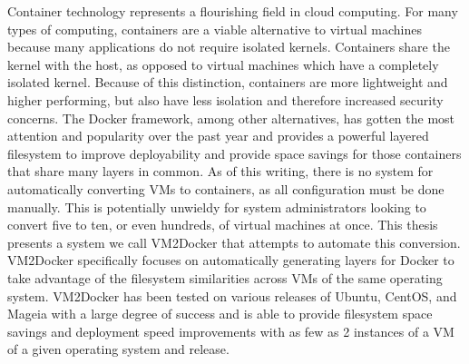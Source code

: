 % 
% 
%
Container technology represents a flourishing field in cloud computing. For many types of computing, containers are a viable alternative to virtual machines because many applications do not require isolated kernels. Containers share the kernel with the host, as opposed to virtual machines which have a completely isolated kernel. Because of this distinction, containers are more lightweight and higher performing, but also have less isolation and therefore increased security concerns. The Docker framework, among other alternatives, has gotten the most attention and popularity over the past year and provides a powerful layered filesystem to improve deployability and provide space savings for those containers that share many layers in common. As of this writing, there is no system for automatically converting VMs to containers, as all configuration must be done manually. This is potentially unwieldy for system administrators looking to convert five to ten, or even hundreds, of virtual machines at once.  This thesis presents a system we call VM2Docker that attempts to automate this conversion. VM2Docker specifically focuses on automatically generating layers for Docker to take advantage of the filesystem similarities across VMs of the same operating system. VM2Docker has been tested on various releases of Ubuntu, CentOS, and Mageia with a large degree of success and is able to provide filesystem space savings and deployment speed improvements with as few as 2 instances of a VM of a given operating system and release.
